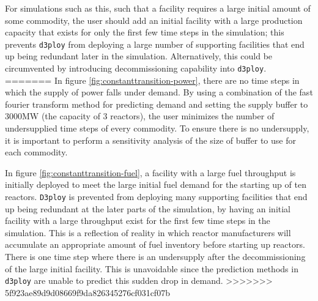 \documentclass[11pt,letterpaper]{article}
\newcommand{\deploy}{\texttt{d3ploy}\xspace}%
\newcommand{\Deploy}{\texttt{D3ploy}\xspace}%
\begin{document}
For simulations such as this, such that a facility requires a large initial amount of some
commodity, the user should add an initial
facility with a large production capacity that exists for only the first few time steps
in the simulation; this prevents \deploy from deploying a large number
of supporting facilities that end up being redundant later in
the simulation.
Alternatively, this could be circumvented by introducing decommissioning 
capability into \deploy.  
=======
In figure \ref{fig:constanttransition-power}, there are no time steps
in which the supply of power falls under demand.
By using a combination of the fast fourier transform method for predicting 
demand and setting the supply buffer to 3000MW (the capacity of 3 reactors), 
the user minimizes the number of undersupplied time steps of every commodity. 
To ensure there is no undersupply, it is important to perform a
sensitivity analysis of the size 
of buffer to use for each commodity. 

In figure \ref{fig:constanttransition-fuel},
a facility with a large fuel throughput is initially
deployed to meet the large initial fuel demand for the starting
up of ten reactors. 
\Deploy is prevented from deploying many supporting
facilities that end up being redundant at the later parts of 
the simulation, by having an initial facility with a large throughput
exist for the first few time steps in the simulation.
This is a reflection of reality in which reactor manufacturers will 
accumulate an appropriate amount of fuel inventory before starting 
up reactors. 
There is one time step where there is an undersupply after the 
decommissioning of the large initial facility.  
This is unavoidable since the prediction methods in \deploy are 
unable to predict this sudden drop in demand. 
>>>>>>> 5f923ae89d9d08669f9da826345276cf031cf07b
\end{document}
